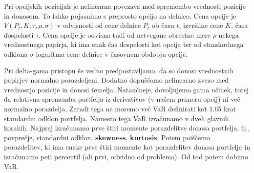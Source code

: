 \documentclass[12pt,a4paper]{amsart}
\theoremstyle{definition} %
\theoremstyle{definition}
\theoremstyle{definition}
\theoremstyle{definition}
\theoremstyle{plain} %
\begin{document}
Pri opcijskih pozicijah je nelinearna povezava med spremembo vrednosti pozicije in donosom. 
To lahko pojasnimo s preprosto opcijo na delnico. Cena opcije je $V(P_t,K,\tau,\rho,\sigma)$ v 
odvisnosti od cene delnice $P_t$ ob času $t$, izvršilne cene $K$, časa dospelosti $\tau$. 
Cena opcije je odvisna tudi od netvegane obrestne mere $\rho$ nekega vrednostnega papirja, ki ima enak
čas dospelosti kot opcija ter od standardnega odklona $\sigma$ logaritma cene delnice v časovnem obdobju opcije.

Pri delta-gama pristopu še vedno predpostavljamo, da so donosi vrednostnih papirjev normalno porazdeljeni. 
Dodatno dopuščamo nelinearno zvezo med vrednostjo pozicije in donosi temelja. Natančneje, dovoljujemo gama učinek,
torej da relativna sprememba portfelja iz derivativov (v našem primeru opcij) ni več normalno porazdelja. 
Zaradi tega ne moremo več VaR definirati kot 1.65 krat standardni odklon portfelja. Namesto tega VaR 
izračunamo v dveh glavnih korakih. Najprej izračunamo prve štiri momente porazdelitve donosa portfelja, tj.,
povprečje, standardni odklon, \textbf{skewness}, \textbf{kurtosis}. Potem poiščemo 
porazdelitev, ki ima enake prve štiri momente kot porazdelitev donosa portfelja in izračunamo peti 
percentil (ali prvi, odvidno od problema). Od tod potem dobimo VaR.
\end{document}
